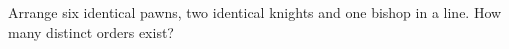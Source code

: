 Arrange six identical pawns, two identical knights and one bishop in a line. How many distinct orders exist?
